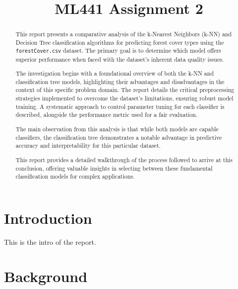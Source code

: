 \documentclass[conference]{IEEEtran}
\begin{document}
\title{ML441 Assignment 2}

\author{
}

\maketitle

\begin{abstract}
This report presents a comparative analysis of the k-Nearest Neighbors (k-NN) and Decision Tree classification algorithms for predicting forest cover types using the \texttt{forestCover.csv} dataset. The primary goal is to determine which model offers superior performance when faced with the dataset's inherent data quality issues.

The investigation begins with a foundational overview of both the k-NN and classification tree models, highlighting their advantages and disadvantages in the context of this specific problem domain. The report details the critical preprocessing strategies implemented to overcome the dataset's limitations, ensuring robust model training. A systematic approach to control parameter tuning for each classifier is described, alongside the performance metric used for a fair evaluation.

The main observation from this analysis is that while both models are capable classifiers, the classification tree demonstrates a notable advantage in predictive accuracy and interpretability for this particular dataset.

This report provides a detailed walkthrough of the process followed to arrive at this conclusion, offering valuable insights in selecting between these fundamental classification models for complex applications.
\end{abstract}

\section{\textbf{Introduction}}
This is the intro of the report.

\section{\textbf{Background}}
\end{document}
